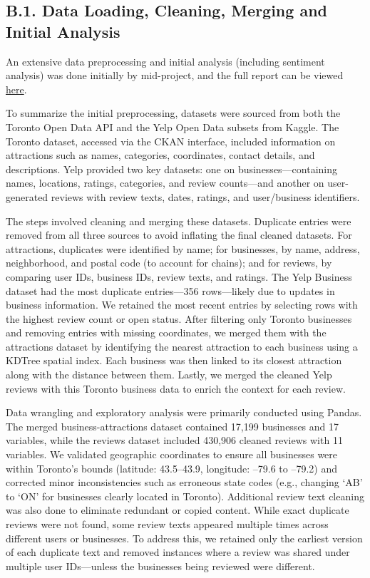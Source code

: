 \documentclass[
]{article}
\begin{document}
\subsection{B.1. Data Loading, Cleaning, Merging and Initial
Analysis}\label{b.1.-data-loading-cleaning-merging-and-initial-analysis}

An extensive data preprocessing and initial analysis (including
sentiment analysis) was done initially by mid-project, and the full
report can be viewed
\href{https://github.com/naurataufiq/business-analysis/blob/main/business_analysis.pdf}{here}.

To summarize the initial preprocessing, datasets were sourced from both
the Toronto Open Data API and the Yelp Open Data subsets from Kaggle.
The Toronto dataset, accessed via the CKAN interface, included
information on attractions such as names, categories, coordinates,
contact details, and descriptions. Yelp provided two key datasets: one
on businesses---containing names, locations, ratings, categories, and
review counts---and another on user-generated reviews with review texts,
dates, ratings, and user/business identifiers.

The steps involved cleaning and merging these datasets. Duplicate
entries were removed from all three sources to avoid inflating the final
cleaned datasets. For attractions, duplicates were identified by name;
for businesses, by name, address, neighborhood, and postal code (to
account for chains); and for reviews, by comparing user IDs, business
IDs, review texts, and ratings. The Yelp Business dataset had the most
duplicate entries---356 rows---likely due to updates in business
information. We retained the most recent entries by selecting rows with
the highest review count or open status. After filtering only Toronto
businesses and removing entries with missing coordinates, we merged them
with the attractions dataset by identifying the nearest attraction to
each business using a KDTree spatial index. Each business was then
linked to its closest attraction along with the distance between them.
Lastly, we merged the cleaned Yelp reviews with this Toronto business
data to enrich the context for each review.

Data wrangling and exploratory analysis were primarily conducted using
Pandas. The merged business-attractions dataset contained 17,199
businesses and 17 variables, while the reviews dataset included 430,906
cleaned reviews with 11 variables. We validated geographic coordinates
to ensure all businesses were within Toronto's bounds (latitude:
43.5--43.9, longitude: --79.6 to --79.2) and corrected minor
inconsistencies such as erroneous state codes (e.g., changing `AB' to
`ON' for businesses clearly located in Toronto). Additional review text
cleaning was also done to eliminate redundant or copied content. While
exact duplicate reviews were not found, some review texts appeared
multiple times across different users or businesses. To address this, we
retained only the earliest version of each duplicate text and removed
instances where a review was shared under multiple user IDs---unless the
businesses being reviewed were different.
\end{document}
